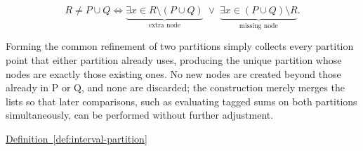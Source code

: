 \begin{remark*}
\[
R \ne P \cup Q
\Longleftrightarrow
\underbrace{\exists x \in R \setminus (P \cup Q)}_{\text{extra node}}
\;\lor\;
\underbrace{\exists x \in (P \cup Q) \setminus R}_{\text{missing node}}.
\]
\end{remark*}

\begin{remark*}[Interpretation]
Forming the common refinement of two partitions simply collects every partition point that either partition already uses, producing the unique partition whose nodes are exactly those existing ones. No new nodes are created beyond those already in P or Q, and none are discarded; the construction merely merges the lists so that later comparisons, such as evaluating tagged sums on both partitions simultaneously, can be performed without further adjustment.
\end{remark*}

\begin{remark*}[Dependencies]
\hyperref[def:interval-partition]{Definition~\ref*{def:interval-partition}}
\end{remark*}

